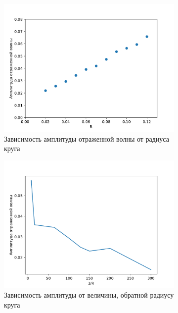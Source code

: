 \documentclass[a4paper, fontsize=14pt]{article}
\begin{document}
\begin{figure}
	\begin{subfigure}{1\textwidth}
	\centering
    \includegraphics[width=\textwidth]{refl_amp.pdf}
    \caption{Зависимость амплитуды отраженной волны от радиуса круга }
	\label{reflamp}
	\end{subfigure}
	\begin{subfigure}{1\textwidth}
    \centering
    \includegraphics[width=1\textwidth]{refl_amp_inv.pdf}
    \caption{Зависимость амплитуды от величины, обратной радиусу круга }
    \label{reflampinv}
	\end{subfigure}
    \caption{}
\end{figure}
\end{document}

